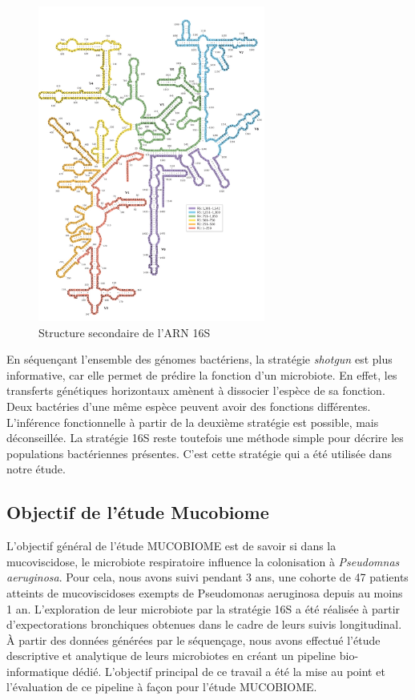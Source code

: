 \documentclass[12pt,a4paper]{article}
\begin{document}
\begin{figure}[ht]
\begin{center}
\includegraphics[scale=0.8]{img/ARN_16S.png}\hfill
\end{center}
\caption{Structure secondaire de l'ARN 16S}
\label{ARN16S}
\end{figure}


En séquençant l'ensemble des génomes bactériens, la stratégie \textit{shotgun} est plus informative, car elle permet de prédire la fonction d'un microbiote. En effet, les transferts génétiques horizontaux amènent à dissocier l'espèce de sa fonction. Deux bactéries d'une même espèce peuvent avoir des fonctions différentes. L'inférence fonctionnelle à partir de la deuxième stratégie est possible, mais déconseillée.  
La stratégie 16S reste toutefois une méthode simple pour décrire les populations bactériennes présentes. C'est cette stratégie qui a été utilisée dans notre étude. 



\subsection{Objectif de l'étude Mucobiome}
L'objectif général de l'étude MUCOBIOME est de savoir si dans la mucoviscidose, le microbiote respiratoire influence la colonisation à \textit{Pseudomnas aeruginosa}. 
Pour cela, nous avons suivi pendant 3 ans,  une cohorte de 47 patients atteints de mucoviscidoses exempts de Pseudomonas aeruginosa depuis au moins 1 an.
L'exploration de leur microbiote par la stratégie 16S a été réalisée à partir d'expectorations bronchiques obtenues dans le cadre de leurs suivis longitudinal. 
À partir des données générées par le séquençage, nous avons effectué l'étude descriptive et analytique de leurs microbiotes en créant un pipeline bio-informatique dédié. L'objectif principal de ce travail a été la mise au point et l'évaluation de ce pipeline à façon pour l'étude MUCOBIOME.
\end{document}
